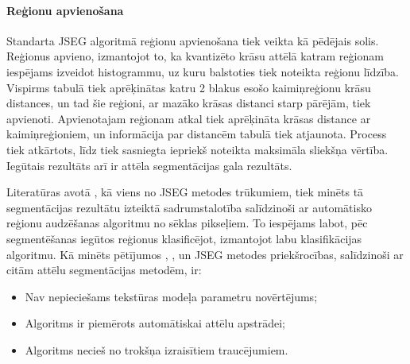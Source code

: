\documentclass[12pt,paper=a4]{report}
\begin{document}
\paragraph{Reģionu apvienošana}Standarta JSEG algoritmā reģionu apvienošana tiek veikta kā pēdējais solis. Reģionus apvieno, izmantojot to, ka kvantizēto krāsu attēlā katram reģionam iespējams izveidot histogrammu, uz kuru balstoties tiek noteikta reģionu līdzība. Vispirms tabulā tiek aprēķinātas katru 2 blakus esošo kaimiņreģionu krāsu distances, un tad šie reģioni, ar mazāko krāsas distanci starp pārējām, tiek apvienoti. Apvienotajam reģionam atkal tiek aprēķināta krāsas distance ar kaimiņreģioniem, un informācija par distancēm tabulā tiek atjaunota. Process tiek atkārtots, līdz tiek sasniegta iepriekš noteikta maksimāla sliekšņa vērtība. Iegūtais rezultāts arī ir attēla segmentācijas gala rezultāts.\cite{1colImSegm1999}\par 
Literatūras avotā \cite{3seededRegGrow2005}, kā viens no JSEG metodes trūkumiem, tiek minēts tā segmentācijas rezultātu izteiktā sadrumstalotība salīdzinoši ar automātisko reģionu audzēšanas algoritmu no sēklas pikseļiem. To iespējams labot, pēc segmentēšanas iegūtos reģionus klasificējot, izmantojot labu klasifikācijas algoritmu. Kā minēts pētījumos \cite{1colImSegm1999}, \cite{2unsupImSegm2001}, \cite{6buildings2008} un \cite{5forest2007} JSEG metodes priekšrocības, salīdzinoši ar citām attēlu segmentācijas metodēm, ir:
\begin{itemize}
\item Nav nepieciešams tekstūras modeļa parametru novērtējums;
\item Algoritms ir piemērots automātiskai attēlu apstrādei;
\item Algoritms necieš no trokšņa izraisītiem traucējumiem.
\end{itemize}
\end{document}
